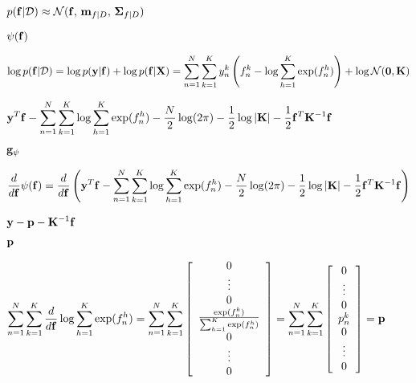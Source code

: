\documentclass{article}
\def\lthtmlcheckvsize{\ifdim\ht\sizebox<\vsize 
  \ifdim\wd\sizebox<\hsize\expandafter\hfill\fi \expandafter\vfill
  \else\expandafter\vss\fi}%
\begin{document}
{\newpage\clearpage
{}%
$ p({\bf f}|{\cal D})\approx {\cal N}({\bf f},\,{\bf m}_{f|D},\,{\bf\Sigma}_{f|D})$%
\lthtmlindisplaymathZ
\lthtmlcheckvsize\clearpage}

{\newpage\clearpage
{}%
$\displaystyle \psi({\bf f})$%
\lthtmlindisplaymathZ
\lthtmlcheckvsize\clearpage}

{\newpage\clearpage
{}%
$\displaystyle \log p({\bf f}|{\cal D})
=\log p({\bf y}|{\bf f}) + \log p({\bf f}|{\bf X})
=\sum_{n=1}^N\sum_{k=1}^K y_n^k\left(f_n^k-\log\sum_{h=1}^K\exp(f_n^h)\right)
+\log {\cal N}({\bf0},{\bf K})$%
\lthtmlindisplaymathZ
\lthtmlcheckvsize\clearpage}

{\newpage\clearpage
{}%
$\displaystyle {\bf y}^T{\bf f}-\sum_{n=1}^N\sum_{k=1}^K \log \sum_{h=1}^K\exp(f_n^h)
-\frac{N}{2}\log(2\pi)-\frac{1}{2}\log|{\bf K}|
-\frac{1}{2}{\bf f}^T {\bf K}^{-1}{\bf f}$%
\lthtmlindisplaymathZ
\lthtmlcheckvsize\clearpage}

{\newpage\clearpage
{}%
$\displaystyle {\bf g}_\psi$%
\lthtmlindisplaymathZ
\lthtmlcheckvsize\clearpage}

{\newpage\clearpage
{}%
$\displaystyle \frac{d}{d{\bf f}} \psi({\bf f})=\frac{d}{d{\bf f}} \left(
{\bf y}^T{\bf f}-\sum_{n=1}^N\sum_{k=1}^K \log \sum_{h=1}^K\exp(f_n^h)
-\frac{N}{2}\log(2\pi)-\frac{1}{2}\log|{\bf K}|
-\frac{1}{2}{\bf f}^T {\bf K}^{-1}{\bf f}\right)$%
\lthtmlindisplaymathZ
\lthtmlcheckvsize\clearpage}

{\newpage\clearpage
{}%
$\displaystyle {\bf y}-{\bf p}-{\bf K}^{-1}{\bf f}$%
\lthtmlindisplaymathZ
\lthtmlcheckvsize\clearpage}

{\newpage\clearpage
{}%
$ {\bf p}$%
\lthtmlindisplaymathZ
\lthtmlcheckvsize\clearpage}

{\newpage\clearpage
{}%
$\displaystyle \sum_{n=1}^N\sum_{k=1}^K \frac{d}{d{\bf f}} \log \sum_{h=1}^K\exp(f_n^h)
=\sum_{n=1}^N\sum_{k=1}^K \left[\begin{array}{c}0\\\vdots\\0\\
\frac{\exp(f_n^k)}{\sum_{h=1}^K\exp(f_n^h)}\\0\\\vdots\\0\end{array}\right]
=\sum_{n=1}^N\sum_{k=1}^K \left[\begin{array}{c}0\\\vdots\\0\\
p_n^k\\0\\\vdots\\0\end{array}\right]={\bf p}$%
\lthtmlindisplaymathZ
\lthtmlcheckvsize\clearpage}
\end{document}
